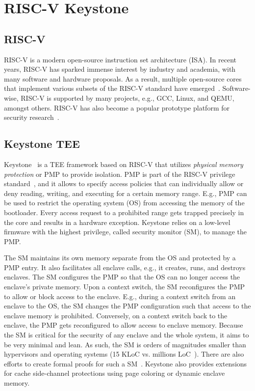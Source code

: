 \section{RISC-V Keystone}

\subsection{RISC-V}
RISC-V is a modern open-source instruction set architecture (ISA). In recent years, RISC-V has sparked immense interest by industry and academia, with many software and hardware proposals. As a result, multiple open-source cores that implement various subsets of the RISC-V standard have emerged~\cite{ariane,asanovic2016rocket,riscy,asanovic2015boom}. Software-wise, RISC-V is supported by many projects, e.g., GCC, Linux, and QEMU, amongst others. RISC-V has also become a popular prototype platform for security research~\cite{weiser2019timber,costan2016sanctum,keystone}.


\subsection{Keystone TEE}

Keystone~\cite{keystone} is a TEE framework based on RISC-V that utilizes \emph{physical memory protection} or PMP to provide isolation. PMP is part of the RISC-V privilege standard~\cite{riscv2019privspec}, and it allows to specify access policies that can individually allow or deny reading, writing, and executing for a certain memory range. E.g., PMP can be used to restrict the operating system (OS) from accessing the memory of the bootloader. Every access request to a prohibited range gets trapped precisely in the core and results in a hardware exception. Keystone relies on a low-level firmware with the highest privilege, called security monitor (SM), to manage the PMP. 

The SM maintains its own memory separate from the OS and protected by a PMP entry. It also facilitates all enclave calls, e.g., it creates, runs, and destroys enclaves. The SM configures the PMP so that the OS can no longer access the enclave's private memory. Upon a context switch, the SM reconfigures the PMP to allow or block access to the enclave. E.g., during a context switch from an enclave to the OS, the SM changes the PMP configuration such that access to the enclave memory is prohibited. Conversely, on a context switch back to the enclave, the PMP gets reconfigured to allow access to enclave memory. 
Because the SM is critical for the security of any enclave and the whole system, it aims to be very minimal and lean. As such, the SM is orders of magnitudes smaller than hypervisors and operating systems (15 KLoC vs. millions LoC~\cite{torvalds2020linux,barham2003xen}). There are also efforts to create formal proofs for such a SM~\cite{lebedev2019sanctorum}. Keystone also provides extensions for cache side-channel protections using page coloring or dynamic enclave memory. 



